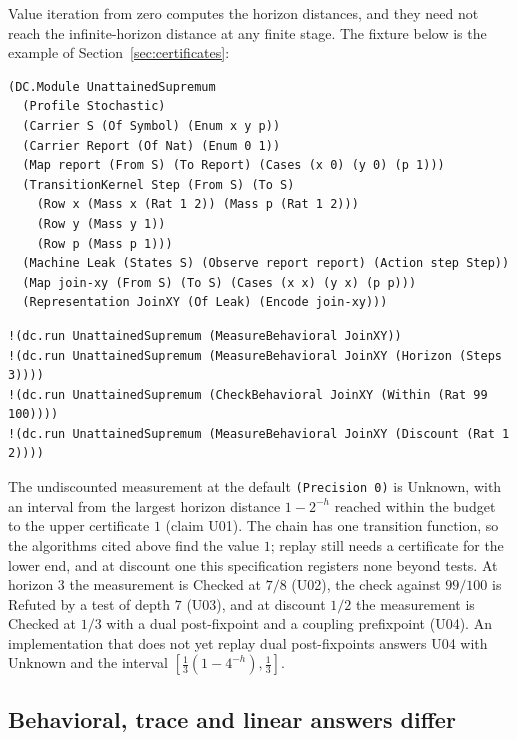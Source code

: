\documentclass[11pt]{article}
\newcommand{\code}[1]{\texttt{#1}}
\theoremstyle{definition}
\theoremstyle{plain}
\begin{document}
Value iteration from zero computes the horizon distances, and they need not reach the
infinite-horizon distance at any finite stage. The fixture below is the example of
Section~\ref{sec:certificates}:
\begin{lstlisting}[basicstyle=\ttfamily\footnotesize,title={\scriptsize\ttfamily fixtures/certificate\_limits.metta}]
(DC.Module UnattainedSupremum
  (Profile Stochastic)
  (Carrier S (Of Symbol) (Enum x y p))
  (Carrier Report (Of Nat) (Enum 0 1))
  (Map report (From S) (To Report) (Cases (x 0) (y 0) (p 1)))
  (TransitionKernel Step (From S) (To S)
    (Row x (Mass x (Rat 1 2)) (Mass p (Rat 1 2)))
    (Row y (Mass y 1))
    (Row p (Mass p 1)))
  (Machine Leak (States S) (Observe report report) (Action step Step))
  (Map join-xy (From S) (To S) (Cases (x x) (y x) (p p)))
  (Representation JoinXY (Of Leak) (Encode join-xy)))
\end{lstlisting}
\begin{lstlisting}[basicstyle=\ttfamily\footnotesize,title={\scriptsize\ttfamily fixtures/certificate\_limits.metta}]
!(dc.run UnattainedSupremum (MeasureBehavioral JoinXY))
!(dc.run UnattainedSupremum (MeasureBehavioral JoinXY (Horizon (Steps 3))))
!(dc.run UnattainedSupremum (CheckBehavioral JoinXY (Within (Rat 99 100))))
!(dc.run UnattainedSupremum (MeasureBehavioral JoinXY (Discount (Rat 1 2))))
\end{lstlisting}
The undiscounted measurement at the default \code{(Precision 0)} is Unknown, with an interval from
the largest horizon distance $1-2^{-h}$ reached within the budget to the upper certificate $1$
(claim U01). The chain has one transition function, so the algorithms cited above find the value
$1$; replay still needs a certificate for the lower end, and at discount one this specification
registers none beyond tests. At horizon $3$ the measurement is Checked at $7/8$ (U02), the check
against $99/100$ is Refuted by a test of depth $7$ (U03), and at discount $1/2$ the measurement is
Checked at $1/3$ with a dual post-fixpoint and a coupling prefixpoint (U04). An implementation that does not yet replay
dual post-fixpoints answers U04 with Unknown and the interval $[\tfrac13(1-4^{-h}),\tfrac13]$.

\subsection{Behavioral, trace and linear answers differ}\label{sec:linear}
\end{document}
